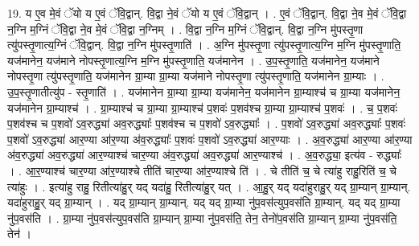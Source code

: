 \documentclass[17pt]{extarticle}
\begin{document}
19. य ए॒व मे॒वं ॅयो य ए॒वं ॅवि॒द्वान्. वि॒द्वा ने॒वं ॅयो य ए॒वं ॅवि॒द्वान् । . ए॒वं ॅवि॒द्वान्. वि॒द्वा ने॒व मे॒वं ॅवि॒द्वा न॒ग्नि म॒ग्निं ॅवि॒द्वा ने॒व मे॒वं ॅवि॒द्वा न॒ग्निम् । . वि॒द्वा न॒ग्नि म॒ग्निं ॅवि॒द्वान्. वि॒द्वा न॒ग्नि मु॑पस्तृ॒णा त्यु॑पस्तृ॒णात्य॒ग्निं ॅवि॒द्वान्. वि॒द्वा न॒ग्नि मु॑पस्तृ॒णाति॑ । . अ॒ग्नि मु॑पस्तृ॒णा त्यु॑पस्तृ॒णात्य॒ग्नि म॒ग्नि मु॑पस्तृ॒णाति॒ यज॑मानेन॒ यज॑माने नोपस्तृ॒णात्य॒ग्नि म॒ग्नि मु॑पस्तृ॒णाति॒ यज॑मानेन । . उ॒प॒स्तृ॒णाति॒ यज॑मानेन॒ यज॑माने नोपस्तृ॒णा त्यु॑पस्तृ॒णाति॒ यज॑मानेन ग्रा॒म्या ग्रा॒म्या यज॑माने नोपस्तृ॒णा त्यु॑पस्तृ॒णाति॒ यज॑मानेन ग्रा॒म्याः । . उ॒प॒स्तृ॒णातीत्यु॑प - स्तृ॒णाति॑ । . यज॑मानेन ग्रा॒म्या ग्रा॒म्या यज॑मानेन॒ यज॑मानेन ग्रा॒म्याश्च॑ च ग्रा॒म्या यज॑मानेन॒ यज॑मानेन ग्रा॒म्याश्च॑ । . ग्रा॒म्याश्च॑ च ग्रा॒म्या ग्रा॒म्याश्च॑ प॒शवः॑ प॒शव॑श्च ग्रा॒म्या ग्रा॒म्याश्च॑ प॒शवः॑ । . च॒ प॒शवः॑ प॒शव॑श्च च प॒शवो॑ ऽव॒रुद्ध्या॑ अव॒रुद्ध्याः᳚ प॒शव॑श्च च प॒शवो॑ ऽव॒रुद्ध्याः᳚ । . प॒शवो॑ ऽव॒रुद्ध्या॑ अव॒रुद्ध्याः᳚ प॒शवः॑ प॒शवो॑ ऽव॒रुद्ध्या॑ आर॒ण्या आ॑र॒ण्या अ॑व॒रुद्ध्याः᳚ प॒शवः॑ प॒शवो॑ ऽव॒रुद्ध्या॑ आर॒ण्याः । . अ॒व॒रुद्ध्या॑ आर॒ण्या आ॑र॒ण्या अ॑व॒रुद्ध्या॑ अव॒रुद्ध्या॑ आर॒ण्याश्च॑ चार॒ण्या अ॑व॒रुद्ध्या॑ अव॒रुद्ध्या॑ आर॒ण्याश्च॑ । . अ॒व॒रुद्ध्या॒ इत्य॑व - रुद्ध्याः᳚ । . आ॒र॒ण्याश्च॑ चार॒ण्या आ॑र॒ण्याश्चे तीति॑ चार॒ण्या आ॑र॒ण्याश्चे ति॑ । . चे तीति॑ च॒ चे त्या॑हु राहु॒रिति॑ च॒ चे त्या॑हुः । . इत्या॑हु राहु॒ रितीत्या॑हु॒र् यद् यदा॑हु॒ रितीत्या॑हु॒र् यत् । . आ॒हु॒र् यद् यदा॑हुराहु॒र् यद् ग्रा॒म्यान् ग्रा॒म्यान्. यदा॑हुराहु॒र् यद् ग्रा॒म्यान् । . यद् ग्रा॒म्यान् ग्रा॒म्यान्. यद् यद् ग्रा॒म्या नु॑प॒वस॑त्युप॒वस॑ति ग्रा॒म्यान्. यद् यद् ग्रा॒म्या नु॑प॒वस॑ति । . ग्रा॒म्या नु॑प॒वस॑त्युप॒वस॑ति ग्रा॒म्यान् ग्रा॒म्या नु॑प॒वस॑ति॒ तेन॒ तेनो॑प॒वस॑ति ग्रा॒म्यान् ग्रा॒म्या नु॑प॒वस॑ति॒ तेन॑ । \newline
\end{document}

